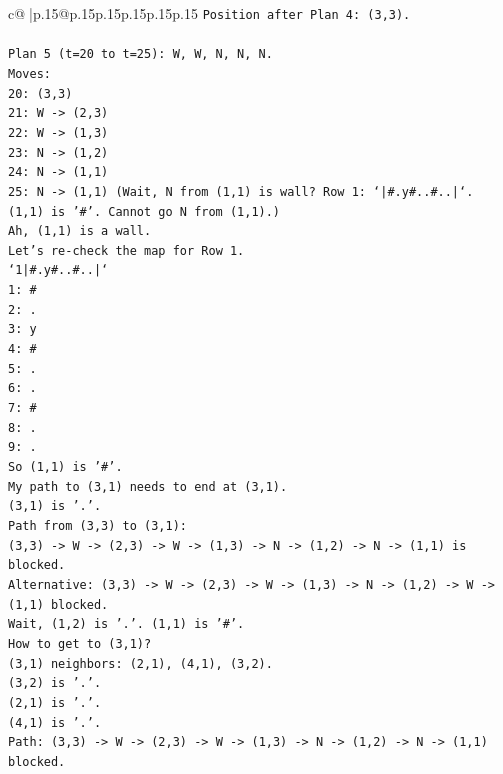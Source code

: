 \documentclass{article}
\begin{document}
{\begin{supertabular}{c@{$\;$}|p{.15\linewidth}@{}p{.15\linewidth}p{.15\linewidth}p{.15\linewidth}p{.15\linewidth}p{.15\linewidth}}
{{{\texttt{Position after Plan 4: (3,3).} \\
\\ 
\texttt{Plan 5 (t=20 to t=25): W, W, N, N, N.} \\
\texttt{Moves:} \\
\texttt{20: (3,3)} \\
\texttt{21: W {-}> (2,3)} \\
\texttt{22: W {-}> (1,3)} \\
\texttt{23: N {-}> (1,2)} \\
\texttt{24: N {-}> (1,1)} \\
\texttt{25: N {-}> (1,1) (Wait, N from (1,1) is wall? Row 1: `|\#.y\#..\#..|`. (1,1) is '\#'. Cannot go N from (1,1).)} \\
\texttt{Ah, (1,1) is a wall.} \\
\texttt{Let's re{-}check the map for Row 1.} \\
\texttt{`1|\#.y\#..\#..|`} \\
\texttt{1: \#} \\
\texttt{2: .} \\
\texttt{3: y} \\
\texttt{4: \#} \\
\texttt{5: .} \\
\texttt{6: .} \\
\texttt{7: \#} \\
\texttt{8: .} \\
\texttt{9: .} \\
\texttt{So (1,1) is '\#'.} \\
\texttt{My path to (3,1) needs to end at (3,1).} \\
\texttt{(3,1) is '.'.} \\
\texttt{Path from (3,3) to (3,1):} \\
\texttt{(3,3) {-}> W {-}> (2,3) {-}> W {-}> (1,3) {-}> N {-}> (1,2) {-}> N {-}> (1,1) is blocked.} \\
\texttt{Alternative: (3,3) {-}> W {-}> (2,3) {-}> W {-}> (1,3) {-}> N {-}> (1,2) {-}> W {-}> (1,1) blocked.} \\
\texttt{Wait, (1,2) is '.'. (1,1) is '\#'.} \\
\texttt{How to get to (3,1)?} \\
\texttt{(3,1) neighbors: (2,1), (4,1), (3,2).} \\
\texttt{(3,2) is '.'.} \\
\texttt{(2,1) is '.'.} \\
\texttt{(4,1) is '.'.} \\
\texttt{Path: (3,3) {-}> W {-}> (2,3) {-}> W {-}> (1,3) {-}> N {-}> (1,2) {-}> N {-}> (1,1) blocked.} \\
}}}
\end{supertabular}}
\end{document}
